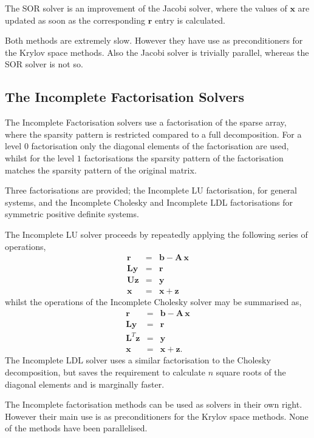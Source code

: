 The SOR solver is an improvement of the Jacobi solver, where the
values of $\mathbf{x}$ are updated as soon as the corresponding $\mathbf{r}$
entry is calculated.

Both methods are extremely slow. However they have use as preconditioners
for the Krylov space methods. Also the Jacobi solver is trivially parallel,
whereas the SOR solver is not so.


\subsection{The Incomplete Factorisation Solvers}\label{s4.2}

The Incomplete Factorisation solvers use a factorisation of the sparse
array, where the sparsity pattern is restricted compared to a full 
decomposition. For a level $0$ factorisation only the diagonal elements of 
the factorisation are used, whilst for the level $1$ factorisations the 
sparsity pattern of the factorisation matches the sparsity pattern of the 
original matrix.

Three factorisations are provided; the Incomplete LU factorisation, for general
systems, and the Incomplete Cholesky and Incomplete LDL factorisations for 
symmetric positive definite systems.

The Incomplete LU solver proceeds by repeatedly applying the following series 
of operations,
\begin{eqnarray}\label{e4.2.1}
\mathbf{r} & = & \mathbf{b - A \, x}\\
\mathbf{L} \mathbf{y} & = & \mathbf{r}\\
\mathbf{U} \mathbf{z} & = & \mathbf{y}\\
\mathbf{x} & = & \mathbf{x} + \mathbf{z}
\end{eqnarray}
whilst the operations of the Incomplete Cholesky solver may be summarised as,
\begin{eqnarray}\label{e4.2.2}
\mathbf{r} & = & \mathbf{b - A \, x}\\
\mathbf{L} \mathbf{y} & = & \mathbf{r}\\
\mathbf{L}^T \mathbf{z} & = & \mathbf{y}\\
\mathbf{x} & = & \mathbf{x} + \mathbf{z}.
\end{eqnarray}
The Incomplete LDL solver uses a similar factorisation to the Cholesky 
decomposition, but saves the requirement to calculate $n$ square roots
of the diagonal elements and is marginally faster.

The Incomplete factorisation methods can be used as solvers in their own right.
However their main use is as preconditioners for the Krylov space methods.
None of the methods have been parallelised.


